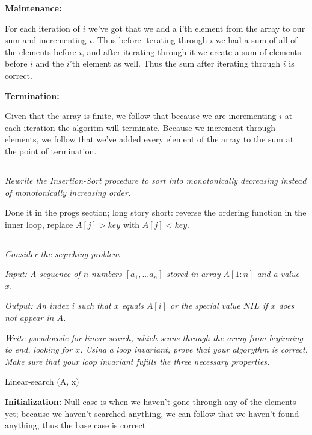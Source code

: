 \documentclass[11pt,oneside,titlepage]{book}
\begin{document}
\textbf{Maintenance: }

For each iteration of $i$ we've got that we add a i'th element from the array to our sum and
incrementing $i$. Thus before iterating through $i$ we had a sum of all of the elements
before $i$, and after iterating through it we create a sum of elements before $i$ and
the $i$'th element as well. Thus the sum after iterating through $i$ is correct.

\textbf{Termination: }

Given that the array is finite, we follow that because we are incrementing $i$ at each
iteration the algoritm will terminate. Because we increment through elements, we follow that
we've added every element of the array to the sum at the point of termination.

\subsection{}

\textit{Rewrite the Insertion-Sort procedure to sort into monotonically decreasing instead
  of monotonically increasing order.}

Done it in the progs section; long story short: reverse the ordering function in the inner loop,
replace  $A[j] > key$ with $A[j] < key$.

\subsection{}

\textit{Consider the seqrching problem}

\textit{Input: A sequence of $n$ numbers $[a_1, ... a_n]$ stored in array $A[1:n]$ and a
  value x.}

\textit{Output: An index $i$ such that $x$ equals $A[i]$ or the special value $NIL$ if $x$
  does not appear in $A$.}

\textit{Write pseudocode for linear search, which scans through the array from beginning to
  end, looking for $x$. Using a loop invariant, prove that your algorythm is correct.
  Make sure that your loop invariant fufills the three necessary properties.}

\begin{function}
  \caption{Linear-search (A, x)}
  \;

\end{function}

\textbf{Initialization: }
Null case is when we haven't gone through any of the elements yet;
because we haven't searched anything, we
can follow that we haven't found anything, thus the base case is correct
\end{document}
